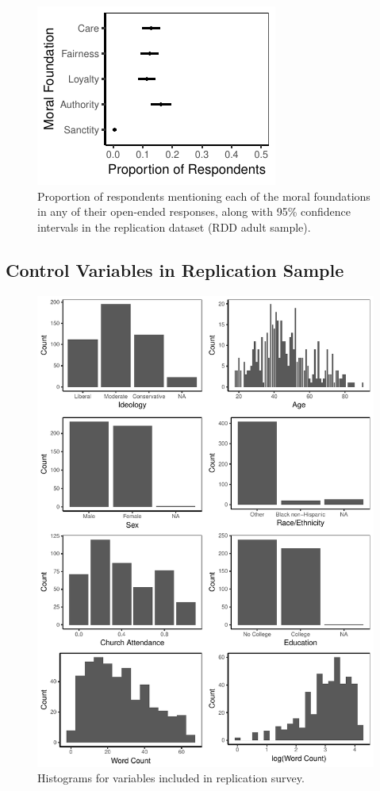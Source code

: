 \documentclass[12pt]{article}
\begin{document}

\begin{figure}[ht]\centering
\includegraphics{../calc/fig/prop_lisurvey.pdf}
\caption{Proportion of respondents mentioning each of the moral foundations in any of their open-ended responses, along with 95\% confidence intervals in the replication dataset (RDD adult sample).}\label{fig:prop_lisurvey}
\end{figure}


\clearpage
\subsection{Control Variables in Replication Sample}



\begin{figure}[h]\centering
\includegraphics[width=.67\textwidth]{../calc/fig/app_lidesc.pdf}
\caption{Histograms for variables included in replication survey.}\label{fig:app_lidesc}
\end{figure}
\end{document}
